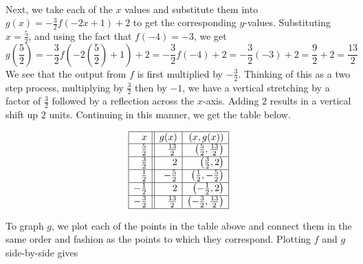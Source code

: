 \begin{ex}
\[\begin{array}{|r||r|r|r|}
\end{array} \]

Next, we take each of the $x$ values and substitute them into $g(x) = -\frac{3}{2}f(-2x+1) +2$ to get the corresponding $y$-values.  Substituting  $x=\frac{5}{2}$, and using the fact that $f(-4)=-3$, we get \[g\left(\frac{5}{2}\right) = -\frac{3}{2}f\left(-2\left(\frac{5}{2}\right) +1\right) +2 = -\frac{3}{2} f(-4) + 2 = -\frac{3}{2}(-3) + 2 = \frac{9}{2} + 2 = \frac{13}{2}\]  We see that the output from $f$ is first multiplied by $-\frac{3}{2}$.  Thinking of this as a two step process, multiplying by $\frac{3}{2}$ then by $-1$, we have  a vertical stretching by a factor of $\frac{3}{2}$ followed by a reflection across the $x$-axis.  Adding $2$ results in a vertical shift up $2$ units.  Continuing in this manner, we get the table below.

\[ \begin{array}{|r||r|r|}  

\hline

 x & g(x) &  (x, g(x)) \\ \hline
\frac{5}{2}  & \frac{13}{2} &  \left(\frac{5}{2}, \frac{13}{2} \right) \\ [1pt] \hline
\frac{3}{2}  & 2 & \left(\frac{3}{2}, 2 \right)\\ [1pt] \hline
\frac{1}{2}  & - \frac{5}{2} & \left(\frac{1}{2}, -\frac{5}{2} \right)  \\ [1pt] \hline
-\frac{1}{2} & 2 &  \left(-\frac{1}{2}, 2 \right) \\ [1pt] \hline
-\frac{3}{2} & \frac{13}{2} &  \left(-\frac{3}{2}, \frac{13}{2} \right) \\ [1pt] \hline
\end{array} \] 

To graph $g$, we plot each of the points in the table above and connect them in the same order and fashion as the points to which they correspond.  Plotting $f$ and $g$ side-by-side gives

\[ \begin{array}{cc}


\end{array}\]
\end{ex}
